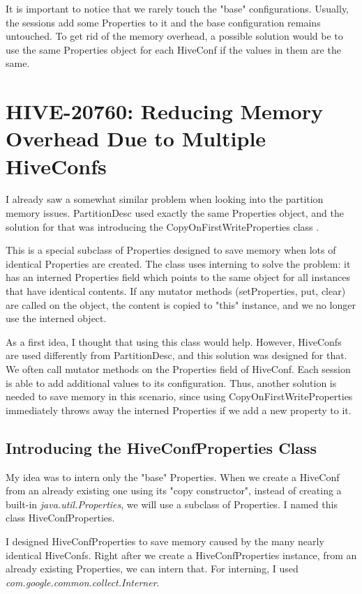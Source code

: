 It is important to notice that we rarely touch the "base" configurations. Usually, the sessions add some Properties to it and the base configuration remains untouched. To get rid of the memory overhead, a possible solution would be to use the same Properties object for each HiveConf if the values in them are the same.

\section{HIVE-20760: Reducing Memory Overhead Due to Multiple HiveConfs}
I already saw a somewhat similar problem when looking into the partition memory issues. PartitionDesc used exactly the same Properties object, and the solution for that was introducing the CopyOnFirstWriteProperties class \cite{hive-partitions}. 

This is a special subclass of Properties designed to save memory when lots of identical Properties are created. The class uses interning to solve the problem: it has an interned Properties field which points to the same object for all instances that have identical contents. If any mutator methods (\eg setProperties, put, clear) are called on the object, the content is copied to "this" instance, and we no longer use the interned object. 

As a first idea, I thought that using this class would help. However, HiveConfs are used differently from PartitionDesc, and this solution was designed for that. We often call mutator methods on the Properties field of HiveConf. Each session is able to add additional values to its configuration. Thus, another solution is needed to save memory in this scenario, since using CopyOnFirstWriteProperties immediately throws away the interned Properties if we add a new property to it.

\subsection{Introducing the HiveConfProperties Class}
My idea was to intern only the "base" Properties. When we create a HiveConf from an already existing one using its "copy constructor", instead of creating a built-in \textit{java.util.Properties}, we will use a subclass of Properties. I named this class HiveConfProperties. 

I designed HiveConfProperties to save memory caused by the many nearly identical HiveConfs. Right after we create a HiveConfProperties instance, from an already existing Properties, we can intern that. For interning, I used \textit{com.google.common.collect.Interner}. 

